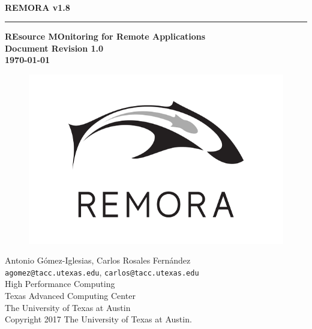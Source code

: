 \documentclass[10pt,a4paper]{report}
\begin{document}
\begin{titlepage}
\thispagestyle{empty}	%
\verb+ +
\vspace{1em}
\begin{flushright}
\huge\bf REMORA v1.8\\
\rule{\textwidth}{4pt}
\large{\bf REsource MOnitoring for Remote Applications\\
Document Revision 1.0\\
\today}
\end{flushright}

\begin{figure}[ht!]
	\centering
	\includegraphics[width=0.5\columnwidth]{logos/Remora-logo-600px.png}
\end{figure}

\newpage
\thispagestyle{empty}
\begin{flushleft}
Antonio G\'omez-Iglesias, Carlos Rosales Fern\'andez \\
\verb+agomez@tacc.utexas.edu+, \verb+carlos@tacc.utexas.edu+\\
\vspace{0.5em}
High Performance Computing \\
Texas Advanced Computing Center\\
The University of Texas at Austin\\
\vspace{1cm}
Copyright 2017 The University of Texas at Austin.
\end{flushleft}
\newpage
\end{titlepage}
\end{document}
